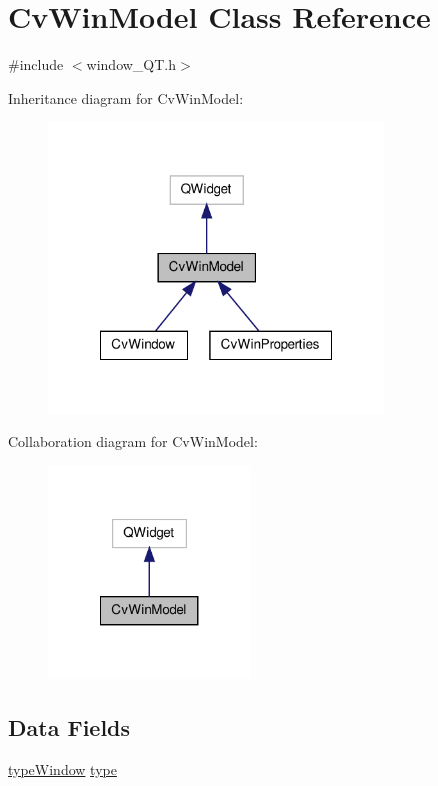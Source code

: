 \hypertarget{classCvWinModel}{\section{Cv\-Win\-Model Class Reference}
\label{classCvWinModel}
}


{\ttfamily \#include $<$window\-\_\-\-Q\-T.\-h$>$}



Inheritance diagram for Cv\-Win\-Model\-:\nopagebreak
\begin{figure}[H]
\begin{center}
\leavevmode
\includegraphics[width=252pt]{classCvWinModel__inherit__graph}
\end{center}
\end{figure}


Collaboration diagram for Cv\-Win\-Model\-:\nopagebreak
\begin{figure}[H]
\begin{center}
\leavevmode
\includegraphics[width=152pt]{classCvWinModel__coll__graph}
\end{center}
\end{figure}
\subsection*{Data Fields}
\begin{DoxyCompactItemize}
\item 
\hyperlink{window__QT_8h_a3ce3f41fe742c83e94d4cd007e7b4c70}{type\-Window} \hyperlink{classCvWinModel_a6b9598fed3bff14f0c10ec85a20ed83e}{type}
\end{DoxyCompactItemize}


